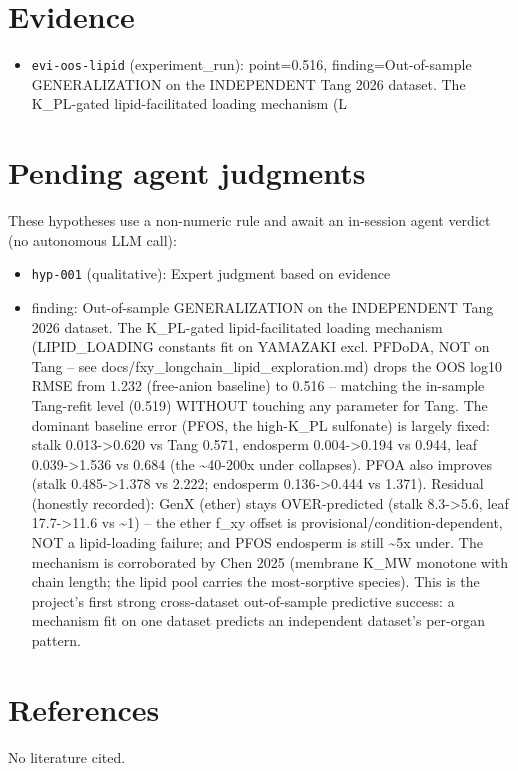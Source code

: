 \documentclass{article}
\begin{document}
\section{Evidence}
\begin{itemize}
  \item \texttt{evi-oos-lipid} (experiment\_run): point=0.516, finding=Out-of-sample GENERALIZATION on the INDEPENDENT Tang 2026 dataset. The K\_PL-gated lipid-facilitated loading mechanism (L
\end{itemize}

\section{Pending agent judgments}
These hypotheses use a non-numeric rule and await an in-session agent verdict (no autonomous LLM call):
\begin{itemize}
  \item \texttt{hyp-001} (qualitative): Expert judgment based on evidence
  \item finding: Out-of-sample GENERALIZATION on the INDEPENDENT Tang 2026 dataset. The K\_PL-gated lipid-facilitated loading mechanism (LIPID\_LOADING constants fit on YAMAZAKI excl. PFDoDA, NOT on Tang -- see docs/fxy\_longchain\_lipid\_exploration.md) drops the OOS log10 RMSE from 1.232 (free-anion baseline) to 0.516 -- matching the in-sample Tang-refit level (0.519) WITHOUT touching any parameter for Tang. The dominant baseline error (PFOS, the high-K\_PL sulfonate) is largely fixed: stalk 0.013->0.620 vs Tang 0.571, endosperm 0.004->0.194 vs 0.944, leaf 0.039->1.536 vs 0.684 (the \textasciitilde{}40-200x under collapses). PFOA also improves (stalk 0.485->1.378 vs 2.222; endosperm 0.136->0.444 vs 1.371). Residual (honestly recorded): GenX (ether) stays OVER-predicted (stalk 8.3->5.6, leaf 17.7->11.6 vs \textasciitilde{}1) -- the ether f\_xy offset is provisional/condition-dependent, NOT a lipid-loading failure; and PFOS endosperm is still \textasciitilde{}5x under. The mechanism is corroborated by Chen 2025 (membrane K\_MW monotone with chain length; the lipid pool carries the most-sorptive species). This is the project's first strong cross-dataset out-of-sample predictive success: a mechanism fit on one dataset predicts an independent dataset's per-organ pattern.
\end{itemize}

\section{References}
No literature cited.
\end{document}
